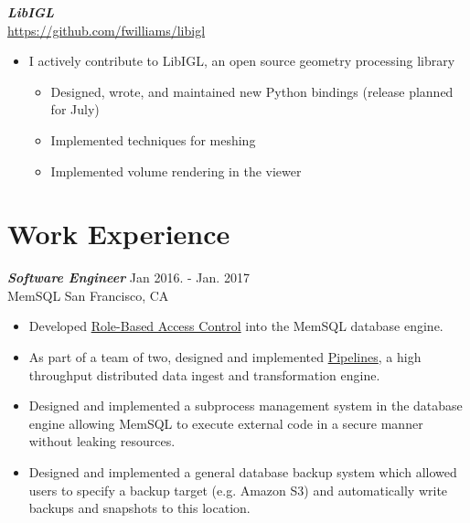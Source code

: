 \documentclass[line,10pt]{res}
\newcommand{\resumetitlemar}{0.5em}
\begin{document}
\begin{resume}
{\sl \textbf{LibIGL}}\\
\url{https://github.com/fwilliams/libigl}
\vspace{\resumetitlemar}
\begin{itemize} \itemsep -2pt
\item I actively contribute to LibIGL, an open source geometry processing library
\vspace{-0.4em}
\begin{itemize} \itemsep -2pt
\item Designed, wrote, and maintained new Python bindings (release planned for July)
\item Implemented techniques for meshing 
\item Implemented volume rendering in the viewer
\end{itemize}
\end{itemize}





\vspace{0.2em}
\section{\Large \sc \textbf Work Experience}
\vspace{0.5em}

{\sl \textbf{Software Engineer}} \hfill Jan 2016. - Jan. 2017 \\
MemSQL \hfill San Francisco, CA\null
\vspace{\resumetitlemar}
\begin{itemize} \itemsep -2pt
\item Developed \href{https://docs.memsql.com/operational-manual/v5.7/role-based-access-control-rbac-deployment-guide/}{Role-Based Access Control} into the MemSQL database engine.
\item As part of a team of two, designed and implemented \href{https://docs.memsql.com/memsql-pipelines/v6.0/pipelines-overview/}{Pipelines}, a high throughput distributed data ingest and transformation engine. 
\item Designed and implemented a subprocess management system in the database engine allowing MemSQL to execute external code in a secure manner without leaking resources.
\item Designed and implemented a general database backup system which allowed users to specify a backup target (e.g. Amazon S3) and automatically write backups and snapshots to this location. 
\end{itemize}


\end{resume}
\end{document}

